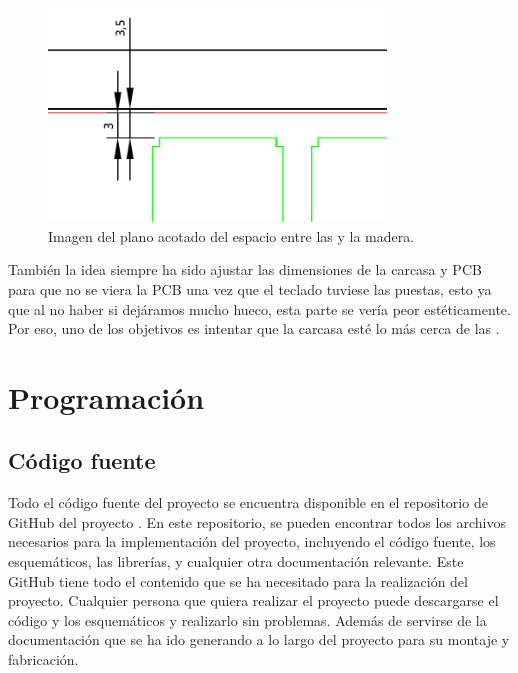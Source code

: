 \begin{figure}[H]
    \centering
    \includegraphics[width=0.8\textwidth]{imagenes/Capitulos/Cap05/AcotadoPCBMadera.png}
    \caption{Imagen del plano acotado del espacio entre las  y la madera.}
    \label{fig:PlanoSeparacionMadera}
\end{figure}

También la idea siempre ha sido ajustar las dimensiones de la carcasa y \gls{PCB} para que no se viera la \gls{PCB} una vez que el teclado tuviese las  puestas, esto ya que al no haber  si dejáramos mucho hueco, esta parte se vería peor estéticamente. Por eso, uno de los objetivos es intentar que la carcasa esté lo más cerca de las .
\newpage

\section{Programación}
\subsection{Código fuente}\label{ApendiceCodigoFuente}

Todo el código fuente del proyecto se encuentra disponible en el repositorio de GitHub del proyecto \cite{ModernWoodGitHub}. En este repositorio, se pueden encontrar todos los archivos necesarios para la implementación del proyecto, incluyendo el código fuente, los esquemáticos, las librerías, y cualquier otra documentación relevante. Este GitHub tiene todo el contenido que se ha necesitado para la realización del proyecto. Cualquier persona que quiera realizar el proyecto puede descargarse el código y los esquemáticos y realizarlo sin problemas. Además de servirse de la documentación que se ha ido generando a lo largo del proyecto para su montaje y fabricación.

